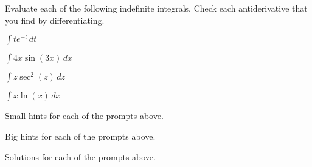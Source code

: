 \begin{activity} \label{A:5.4.1}  Evaluate each of the following indefinite integrals.  Check each antiderivative that you find by differentiating.
\ba
	\item $\int te^{-t} \, dt$
	\item $\int 4x \sin(3x) \, dx$
	\item $\int z \sec^2(z) \,dz$
	\item $\int x \ln(x) \, dx $
\ea
\end{activity}
\begin{smallhint}
\ba
	\item Small hints for each of the prompts above.
\ea
\end{smallhint}
\begin{bighint}
\ba
	\item Big hints for each of the prompts above.
\ea
\end{bighint}
\begin{activitySolution}
\ba
	\item Solutions for each of the prompts above.
\ea
\end{activitySolution}
\aftera